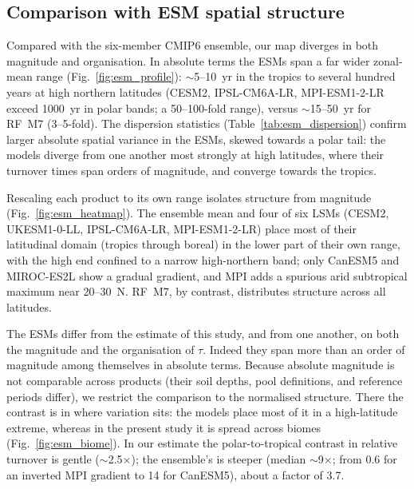 \documentclass[12pt, a4paper]{article}
\begin{document}
\subsection{Comparison with ESM spatial structure}
\label{sec:results_esm}

Compared with the six-member CMIP6 ensemble, our map diverges in both magnitude and
organisation. In absolute terms the ESMs span a far wider zonal-mean range
(Fig.~\ref{fig:esm_profile}): $\sim$5--10~yr in the tropics to several hundred years
at high northern latitudes (CESM2, IPSL-CM6A-LR, MPI-ESM1-2-LR exceed 1000~yr in polar
bands; a 50--100-fold range), versus $\sim$15--50~yr for RF~M7 (3--5-fold). The
dispersion statistics (Table~\ref{tab:esm_dispersion}) confirm larger absolute spatial
variance in the ESMs, skewed towards a polar tail: the models diverge from one another
most strongly at high latitudes, where their turnover times span orders of magnitude,
and converge towards the tropics.

Rescaling each product to its own range isolates structure from magnitude
(Fig.~\ref{fig:esm_heatmap}). The ensemble mean and four of six LSMs (CESM2,
UKESM1-0-LL, IPSL-CM6A-LR, MPI-ESM1-2-LR) place most of their latitudinal domain
(tropics through boreal) in the lower part of their own range, with the high end
confined to a narrow high-northern band; only CanESM5 and MIROC-ES2L show a gradual
gradient, and MPI adds a spurious arid subtropical maximum near 20--30\textdegree{}~N.
RF~M7, by contrast, distributes structure across all latitudes.

The ESMs differ from the estimate of this study, and from one another, on
both the magnitude and the organisation of $\tau$. Indeed they span more than an
order of magnitude among themselves in absolute terms. Because absolute magnitude is not
comparable across products (their soil depths, pool definitions, and reference periods
differ), we restrict the comparison to the normalised structure. There the contrast is
in where variation sits: the models place most of it in a high-latitude extreme, whereas
in the present study it is spread across biomes (Fig.~\ref{fig:esm_biome}). In our
estimate the polar-to-tropical contrast in relative turnover is gentle ($\sim$2.5$\times$);
the ensemble's is steeper (median $\sim$9$\times$; from 0.6 for an inverted MPI gradient to
14 for CanESM5), about a factor of 3.7.
\end{document}
